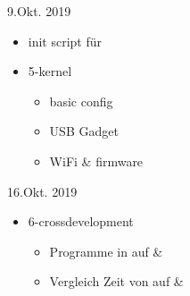 \documentclass{beamer}
\begin{document}
\begin{frame}{9.Okt. 2019}
 \begin{itemize}
  \item init script für \targetS
  \item 5-kernel
  \begin{itemize}
   \item basic config
   \item USB Gadget
   \item WiFi \& firmware
  \end{itemize}
 \end{itemize}
\end{frame}

\begin{frame}{16.Okt. 2019}
 \begin{itemize}
  \item 6-crossdevelopment
  \begin{itemize}
   \item Programme in  auf \host \& \targetS
   \item Vergleich Zeit von  auf \host \& \targetS
  \end{itemize}
 \end{itemize}
\end{frame}
\end{document}
